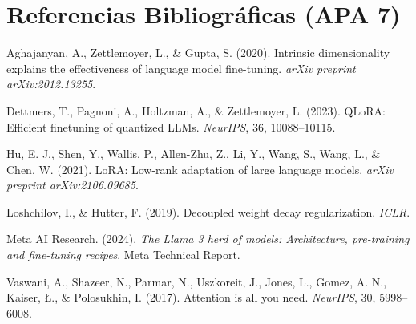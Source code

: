 \documentclass[12pt,letterpaper]{article}
\begin{document}
\section*{Referencias Bibliográficas (APA 7)}
\noindent Aghajanyan, A., Zettlemoyer, L., \& Gupta, S. (2020). Intrinsic dimensionality explains the effectiveness of language model fine-tuning. \textit{arXiv preprint arXiv:2012.13255}.

\noindent Dettmers, T., Pagnoni, A., Holtzman, A., \& Zettlemoyer, L. (2023). QLoRA: Efficient finetuning of quantized LLMs. \textit{NeurIPS}, 36, 10088–10115.

\noindent Hu, E. J., Shen, Y., Wallis, P., Allen-Zhu, Z., Li, Y., Wang, S., Wang, L., \& Chen, W. (2021). LoRA: Low-rank adaptation of large language models. \textit{arXiv preprint arXiv:2106.09685}.

\noindent Loshchilov, I., \& Hutter, F. (2019). Decoupled weight decay regularization. \textit{ICLR}.

\noindent Meta AI Research. (2024). \textit{The Llama 3 herd of models: Architecture, pre-training and fine-tuning recipes}. Meta Technical Report.

\noindent Vaswani, A., Shazeer, N., Parmar, N., Uszkoreit, J., Jones, L., Gomez, A. N., Kaiser, Ł., \& Polosukhin, I. (2017). Attention is all you need. \textit{NeurIPS}, 30, 5998–6008.
\end{document}
